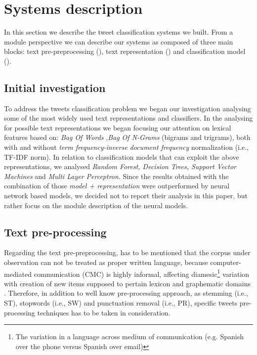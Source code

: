 \section{Systems description} \label{sec:system}

In this section we describe the tweet classification systems we built. From a module perspective we can describe our systems as composed of three main blocks: text pre-preprocessing (),  text representation () and classification model (). 


\subsection{Initial investigation} \label{subsec:boh}
To address the tweets classification problem we began our investigation analysing some of the most widely used text representations and classifiers.
In the analysing for possible text representations we began focusing our attention on lexical features based on: \emph{Bag Of Words} \cite{harris1954distributional},\emph{Bag Of N-Grams} (bigrams and trigrams), both with and without \emph{term frequency-inverse document frequency} normalization (i.e., TF-IDF norm).
In relation to classification models that can exploit the above representations,  we analysed \emph{Random Forest, Decision Trees, Support Vector Machines} and \emph{Multi Layer Perceptron}. Since the results obtained with the combination of those \emph{model + representation} were outperformed by neural network based models, we decided not to report their analysis in this paper, but rather focus on the module description of the neural models.


\subsection{Text pre-processing} \label{subsec:preprocessing}
Regarding the text pre-preprocessing, has to be mentioned that the corpus under observation can not be treated as proper written language, because computer-mediated communication (CMC) is highly informal, affecting diamesic\footnote{The variation in a language across medium of communication (e.g. Spanish over the phone versus Spanish over email)} variation with creation of new items supposed to pertain lexicon and graphematic domains \cite{bazzanella2011oscillazioni,cerruti2013netspeak}.
Therefore, in addition to well know pre-processing approach, as stemming (i.e., ST), stopwords (i.e., SW) and punctuation removal (i.e., PR), specific tweets pre-processing techniques has to be taken in consideration.

